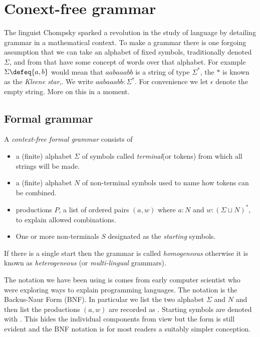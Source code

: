 \section{Conext-free grammar}\label{sec:cfg}

The linguist Chompsky sparked a revolution in the study of language by detailing
grammar in a mathematical context.  To make a grammar there is one forgoing
assumption that we can take an alphabet of fixed symbols, traditionally denoted
$\Sigma$, and from that have some concept of words over that alphabet.  For
example $\Sigma\defeq\{a,b\}$ would mean that $aabaaabb$ is a string of type
$\Sigma^*$, the $*$ is known as the \emph{Kleene star},.  We
write $aabaaabb:\Sigma^*$.  For convenience we let $\epsilon$ denote the empty
string.  More on this in a moment.


\subsection{Formal grammar}
A \emph{context-free formal grammar} consists of 
\begin{itemize}
    \item {} a (finite) alphabet $\Sigma$ 
    of symbols called \emph{terminal}(or tokens) from which all strings will be made.
    \item {} a (finite) alphabet $N$ of non-terminal symbols
    used to name how tokens can be combined.
    \item {} productions $P$, a list of ordered pairs 
    $(a,w)$ where $a:N$ and $w:(\Sigma\sqcup N)^*$, to explain allowed 
    combinations.
    \item One or more non-terminals $S$ designated as the \emph{starting}
    symbols.
\end{itemize}
If there is a single start then the grammar is called \emph{homogeneous}
otherwise it is known as \emph{heterogeneous} (or \emph{multi-lingual} grammars).

The notation we have been using is comes from early computer
scientist who were exploring ways to explain programming languages. The notation
 is the Backus-Naur Form (BNF). In
particular we list the two alphabet $\Sigma$ and $N$ and then list the
productions $(a,w)$ are recorded as .  Starting symbols are
denoted with .  This hides the individual components from 
view but the form is still evident and the BNF notation is for most readers 
a suitably simpler conception.



